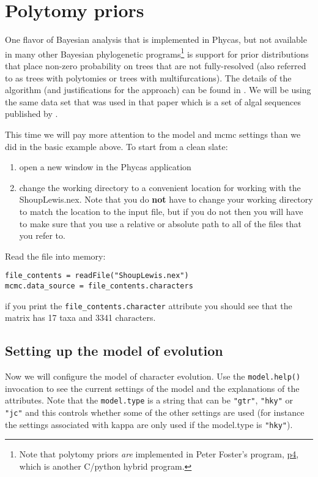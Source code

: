 \documentclass{article}
\newcommand{\cmd}[1]{\texttt{#1}\xspace}
\newcommand{\phycas}{Phycas\xspace}
\newcommand{\localfile}[1]{\textsf{#1}\xspace}
\begin{document}
\section{Polytomy priors}
One flavor of Bayesian analysis that is implemented in \phycas, but not available in many other Bayesian phylogenetic programs\footnote{Note that polytomy priors {\em are} implemented in Peter Foster's program, \href{http://bmnh.org/~pf/p4.html}{p4}, which is another C/python hybrid program.} is support for prior distributions that place non-zero probability on trees that are not fully-resolved (also referred to as trees with polytomies or trees with multifurcations).
The details of the algorithm (and justifications for the approach) can be found in \citet{LewisHH2005}.
We will be using the same data set that was used in that paper which is a set of algal sequences published by \citet{ShoupL2003}.

This time we will pay more attention to the model and mcmc settings than we did in the basic example above.
To start from a clean slate:
\begin{enumerate}
	\item open a new window in the \phycas application
	\item change the working directory to a convenient location for working with the \localfile{ShoupLewis.nex}. Note that you do {\bf not} have to change your working directory to match the location to the input file, but if you do not then you will have to make sure that you use a relative or absolute path to all of the files that you refer to.
\end{enumerate}

Read the file into memory:
\begin{verbatim}
file_contents = readFile("ShoupLewis.nex")
mcmc.data_source = file_contents.characters
\end{verbatim}
if you print the \cmd{file\_contents.character} attribute you should see that the matrix has 17 taxa and 3341 characters.

\subsection{Setting up the model of evolution}
Now we will configure the model of character evolution. 
Use the \cmd{model.help()} invocation to see the current settings of the model and the explanations of the
attributes.
Note that the \cmd{model.type} is a string that can be \texttt{"gtr"}, \texttt{"hky"} or \texttt{"jc"} and this controls whether some of the other settings are used (for instance the settings associated with kappa are only used if the model.type is \texttt{"hky"}).
\end{document}
